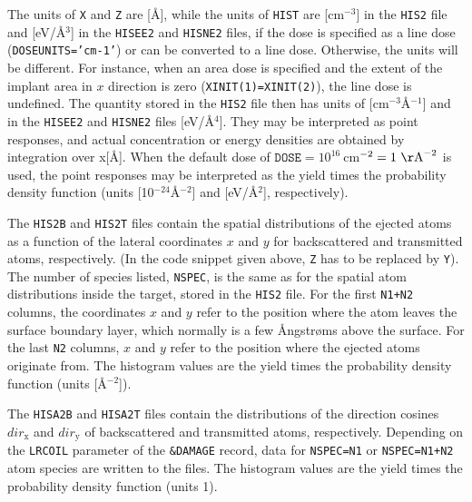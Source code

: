 The units of \texttt{X} and \texttt{Z} are [\AA], while the units of
\texttt{HIST} are [cm$^{-3}$] in the \texttt{HIS2} file and [eV/\AA$^3$] in the
\texttt{HISEE2} and \texttt{HISNE2} files, if the dose is specified as a line
dose (\texttt{DOSEUNITS='cm-1'}) or can be converted to a line dose. Otherwise,
the units will be different. For instance, when an area dose is specified and
the extent of the implant area in $x$ direction is zero
(\texttt{XINIT(1)=XINIT(2)}), the line dose is undefined. The quantity stored
in the \texttt{HIS2} file then has units of [cm$^{-3}$\AA$^{-1}$] and in the
\texttt{HISEE2} and \texttt{HISNE2} files [eV/\AA$^4$]. They may be interpreted
as point responses, and actual concentration or energy densities are obtained
by integration over x[\AA]. When the default dose of $\texttt{DOSE} =
10^{16}~$cm$^{-2} =  1~\mathrm{\AA}^{-2}$ is used, the point responses may be
interpreted as the yield times the probability density function (units
[10$^{-24}$\AA$^{-2}$] and [eV/\AA$^2$], respectively).

The \texttt{HIS2B} and \texttt{HIS2T} files contain the spatial distributions
of the ejected atoms as a function of the lateral coordinates $x$ and $y$ for
backscattered and transmitted atoms, respectively. (In the code snippet given
above, \texttt{Z} has to be replaced by \texttt{Y}). The number of species
listed, \texttt{NSPEC}, is the same as for the spatial atom distributions inside
the target, stored in the \texttt{HIS2} file. For the first \texttt{N1+N2}
columns, the coordinates $x$ and $y$ refer to the position where the atom leaves
the surface boundary layer, which normally is a few {\AA}ngstr{\o}ms above the
surface. For the last \texttt{N2} columns, $x$ and $y$ refer to the position
where the ejected atoms originate from. The histogram values are the yield times
the probability density function (units [\AA$^{-2}$]).

The \texttt{HISA2B} and \texttt{HISA2T} files contain the distributions of the
direction cosines $dir_\mathrm{x}$ and $dir_\mathrm{y}$ of backscattered and
transmitted atoms, respectively. Depending on the \texttt{LRCOIL} parameter of
the \texttt{\&DAMAGE} record, data for \texttt{NSPEC=N1} or \texttt{NSPEC=N1+N2}
atom species are written to the files. The histogram values are the yield times
the probability density function (units 1).
